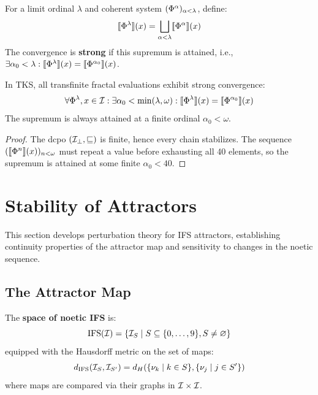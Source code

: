 \begin{definition}
\label{def:limit-ordinal-convergence}
For a limit ordinal $\lambda$ and coherent system $(\Phi^{\alpha})_{\alpha < \lambda}$, define:
\[
\llbracket \Phi^{\lambda} \rrbracket(x) = \bigsqcup_{\alpha < \lambda} \llbracket \Phi^{\alpha} \rrbracket(x)
\]
The convergence is \textbf{strong} if this supremum is attained, i.e., $\exists \alpha_0 < \lambda : \llbracket \Phi^{\lambda} \rrbracket(x) = \llbracket \Phi^{\alpha_0} \rrbracket(x)$.
\end{definition}

\begin{theorem}
\label{thm:strong-convergence}
In TKS, all transfinite fractal evaluations exhibit strong convergence:
\[
\forall \Phi^{\lambda}, x \in \mathcal{I} : \exists \alpha_0 < \min(\lambda, \omega) : \llbracket \Phi^{\lambda} \rrbracket(x) = \llbracket \Phi^{\alpha_0} \rrbracket(x)
\]
The supremum is always attained at a finite ordinal $\alpha_0 < \omega$.
\end{theorem}

\begin{proof}
The dcpo $(\mathcal{I}_\bot, \sqsubseteq)$ is finite, hence every chain stabilizes. The sequence $(\llbracket \Phi^{n} \rrbracket(x))_{n < \omega}$ must repeat a value before exhausting all 40 elements, so the supremum is attained at some finite $\alpha_0 < 40$.
\end{proof}

\section{Stability of Attractors}
\label{sec:attractor-stability}

\begin{tcolorbox}[colback=blue!5!white,colframe=blue!75!black,title=\vnewthree]
This section develops perturbation theory for IFS attractors, establishing continuity properties of the attractor map and sensitivity to changes in the noetic sequence.
\end{tcolorbox}

\subsection{The Attractor Map}

\begin{definition}
\label{def:ifs-space}
The \textbf{space of noetic IFS} is:
\[
\mathrm{IFS}(\mathcal{I}) = \{\mathcal{I}_S \mid S \subseteq \{0, \ldots, 9\}, S \neq \varnothing\}
\]
equipped with the Hausdorff metric on the set of maps:
\[
d_{\mathrm{IFS}}(\mathcal{I}_S, \mathcal{I}_{S'}) = d_H(\{\nu_{k} \mid k \in S\}, \{\nu_{j} \mid j \in S'\})
\]
where maps are compared via their graphs in $\mathcal{I} \times \mathcal{I}$.
\end{definition}

